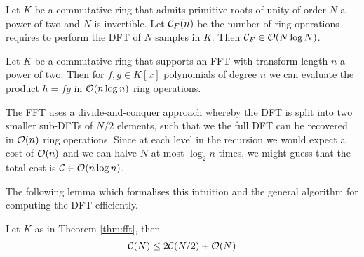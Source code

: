 \begin{theorem}\label{thm:fft}
    Let $K$ be a commutative ring that admits primitive roots of unity of order $N$ a power of two and $N$ is invertible. Let $\mathcal C_F(n)$ be the number of ring operations requires to perform the DFT of $N$ samples in $K$. Then $\mathcal C_F \in \mathcal O(N\log N)$.
\end{theorem}

\begin{corollary}
    Let $K$ be a commutative ring that supports an FFT with transform length $n$ a power of two. Then for $f, g \in K[x]$ polynomials of degree $n$ we can evaluate the product $h = fg$ in $\mathcal O(n\log n)$ ring operations.
\end{corollary}

The FFT uses a divide-and-conquer approach whereby the DFT is split into two smaller sub-DFTs of $N/2$ elements, such that we the full DFT can be recovered in $\mathcal O(n)$ ring operations. Since at each level in the recursion we would expect a cost of $\mathcal O(n)$ and we can halve $N$ at most $\log_2 n$ times, we might guess that the total cost is $\mathcal C \in \mathcal O(n \log n)$.

The following lemma which formalises this intuition and the general algorithm for computing the DFT efficiently. 

\begin{lemma}\label{lem:fft-recursion}
    Let $K$ as in Theorem \ref{thm:fft}, then 
    \begin{equation}\label{eq:fftlem}
        \mathcal C(N) \le 2 \mathcal C(N/2) + \mathcal O(N)
    \end{equation}
\end{lemma}

